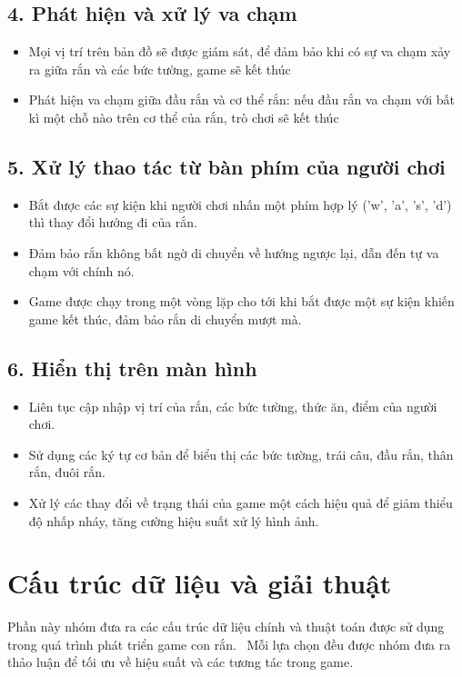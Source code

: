 \documentclass[12pt]{report}
\begin{document}
\subsection*{4. Phát hiện và xử lý va chạm}
\begin{itemize}
    \item Mọi vị trí trên bản đồ sẽ được giám sát, để đảm bảo khi có sự va chạm xảy ra giữa rắn và các bức tường, game sẽ kết thúc
    \item Phát hiện va chạm giữa đầu rắn và cơ thể rắn: nếu đầu rắn va chạm với bất kì một chỗ nào trên cơ thể của rắn, trò chơi sẽ kết thúc
\end{itemize}

\subsection*{5. Xử lý thao tác từ bàn phím của người chơi}
\begin{itemize}
    \item Bắt được các sự kiện khi người chơi nhấn một phím hợp lý ('w', 'a', 's', 'd') thì thay đổi hướng đi của rắn.
    \item Đảm bảo rắn không bất ngờ di chuyển về hướng ngược lại, dẫn đến tự va chạm với chính nó.
    \item Game được chạy trong một vòng lặp cho tới khi bắt được một sự kiện khiến game kết thúc, đảm bảo rắn di chuyển mượt mà.
\end{itemize}

\subsection*{6. Hiển thị trên màn hình}
\begin{itemize}
    \item Liên tục cập nhập vị trí của rắn, các bức tường, thức ăn, điểm của người chơi.
    \item Sử dụng các ký tự cơ bản để biểu thị các bức tường, trái câu, đầu rắn, thân rắn, đuôi rắn.
    \item Xử lý các thay đổi về trạng thái của game một cách hiệu quả để giảm thiểu độ nhấp nháy, tăng cường hiệu suất xử lý hình ảnh.
\end{itemize}


\section*{Cấu trúc dữ liệu và giải thuật}
Phần này nhóm đưa ra các cấu trúc dữ liệu chính và thuật toán được sử dụng trong quá trình phát triển game con rắn. \
Mỗi lựa chọn đều được nhóm đưa ra thảo luận để tối ưu về hiệu suất và các tương tác trong game.
\end{document}
